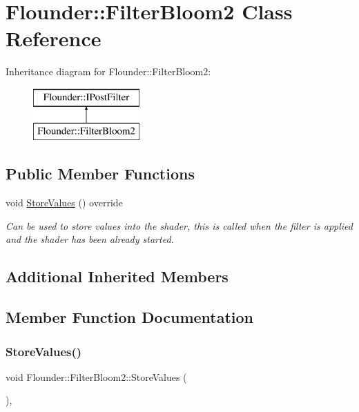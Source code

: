 \hypertarget{class_flounder_1_1_filter_bloom2}{}\section{Flounder\+:\+:Filter\+Bloom2 Class Reference}
\label{class_flounder_1_1_filter_bloom2}
Inheritance diagram for Flounder\+:\+:Filter\+Bloom2\+:\begin{figure}[H]
\begin{center}
\leavevmode
\includegraphics[height=2.000000cm]{class_flounder_1_1_filter_bloom2}
\end{center}
\end{figure}
\subsection*{Public Member Functions}
\begin{DoxyCompactItemize}
\item 
void \hyperlink{class_flounder_1_1_filter_bloom2_ac7f5afadcf4a20e888a8cb5c1399fbeb}{Store\+Values} () override
\begin{DoxyCompactList}\small\item\em Can be used to store values into the shader, this is called when the filter is applied and the shader has been already started. \end{DoxyCompactList}\end{DoxyCompactItemize}
\subsection*{Additional Inherited Members}


\subsection{Member Function Documentation}
\mbox{\label{class_flounder_1_1_filter_bloom2_ac7f5afadcf4a20e888a8cb5c1399fbeb}} 
\subsubsection{\texorpdfstring{Store\+Values()}{StoreValues()}}
{\footnotesize\ttfamily void Flounder\+::\+Filter\+Bloom2\+::\+Store\+Values (\begin{DoxyParamCaption}{ }\end{DoxyParamCaption})\hspace{0.3cm}{\ttfamily [override]}, {\ttfamily [virtual]}}



